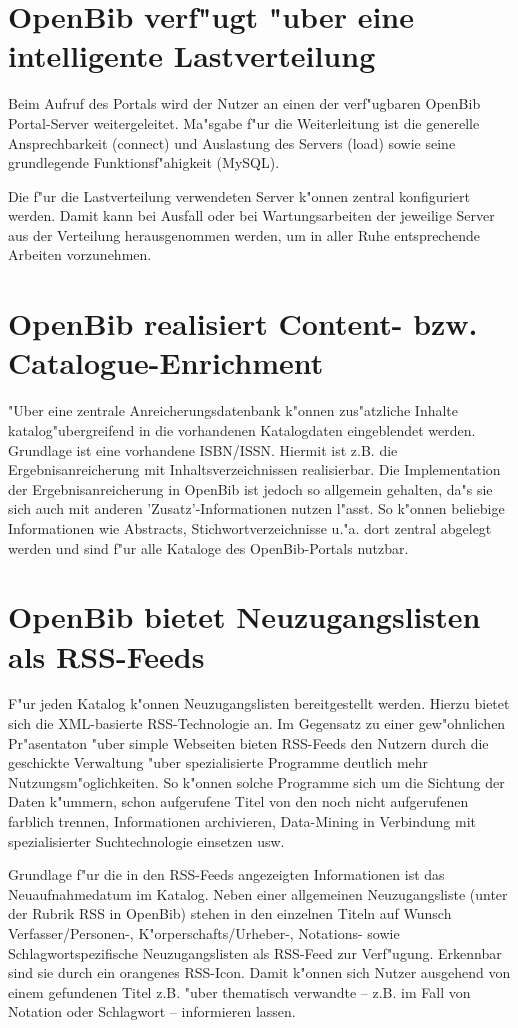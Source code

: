 \documentclass[11pt, twoside, a4paper, BCOR8mm, DIV12, bibtotoc,idxtotoc]{scrbook}
\begin{document}
\section{OpenBib verf"ugt "uber eine intelligente Lastverteilung}
Beim Aufruf des Portals wird der Nutzer an einen der verf"ugbaren
OpenBib Portal-Server weitergeleitet. Ma"sgabe f"ur die Weiterleitung
ist die generelle Ansprechbarkeit (connect) und Auslastung des Servers
(load) sowie seine grundlegende Funktionsf"ahigkeit (MySQL).

Die f"ur die Lastverteilung verwendeten Server k"onnen zentral
konfiguriert werden. Damit kann bei Ausfall oder bei
Wartungsarbeiten der jeweilige Server aus der Verteilung
herausgenommen werden, um in aller Ruhe entsprechende Arbeiten
vorzunehmen.

\section{OpenBib realisiert Content- bzw. Catalogue-Enrichment}
"Uber eine zentrale Anreicherungsdatenbank k"onnen zus"atzliche
Inhalte katalog"ubergreifend in die vorhandenen Katalogdaten
eingeblendet werden. Grundlage ist eine vorhandene ISBN/ISSN. Hiermit
ist z.B. die Ergebnisanreicherung mit Inhaltsverzeichnissen
realisierbar. Die Im\-ple\-men\-ta\-tion der Ergebnisanreicherung in OpenBib
ist jedoch so allgemein gehalten, da"s sie sich auch mit anderen
'Zusatz'-Informationen nutzen l"asst. So k"onnen beliebige
Informationen wie Abstracts, Stichwortverzeichnisse u."a. dort zentral
abgelegt werden und sind f"ur alle Kataloge des OpenBib-Portals
nutzbar.

\section{OpenBib bietet Neuzugangslisten als RSS-Feeds}
F"ur jeden Katalog k"onnen Neuzugangslisten bereitgestellt werden.
Hierzu bietet sich die XML-basierte RSS-Technologie an. Im Gegensatz
zu einer gew"ohnlichen Pr"asentaton "uber simple Webseiten bieten
RSS-Feeds den Nutzern durch die geschickte Verwaltung "uber
spezialisierte Programme deutlich mehr Nutzungsm"oglichkeiten. So
k"onnen solche Programme sich um die Sichtung der Daten k"ummern,
schon aufgerufene Titel von den noch nicht aufgerufenen farblich
trennen, Informationen archivieren, Data-Mining in Verbindung mit
spezialisierter Such\-tech\-no\-lo\-gie einsetzen usw.

Grundlage f"ur die in den RSS-Feeds angezeigten Informationen ist das
Neuaufnahmedatum im Katalog. Neben einer allgemeinen Neuzugangsliste
(unter der Rubrik RSS in OpenBib) stehen in den einzelnen Titeln auf
Wunsch Verfasser/Personen-, K"orperschafts/Urheber-, Notations- sowie
Schlagwortspezifische Neuzugangslisten als RSS-Feed zur Verf"ugung.
Erkennbar sind sie durch ein orangenes RSS-Icon. Damit k"onnen sich
Nutzer ausgehend von einem gefundenen Titel z.B. "uber thematisch
verwandte -- z.B. im Fall von Notation oder Schlagwort -- informieren
lassen.
\end{document}
